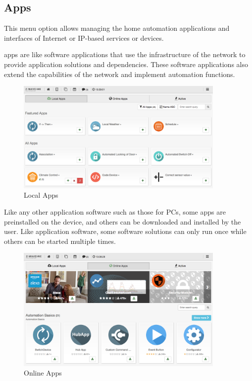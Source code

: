 \subsection{Apps}
\label{appssetup}

This menu option allows managing the home automation applications and interfaces of 
Internet or IP-based services or devices.

\zway apps are like software applications that use the infrastructure of the \zwave 
network to provide application solutions and dependencies. These software applications also 
extend the capabilities of the network and implement automation functions.

\begin{figure}
\begin{center}
\includegraphics[width=0.9\textwidth]{pngs/cap4/app2.png}
\caption{Local Apps}
\label{app2}
\end{center}
\end{figure}

Like any other application software such as those for PCs, some \zway apps are preinstalled 
on the device, and others can be downloaded and installed by the user. Like application 
software, some software solutions can only run once while others can be started multiple times.


\begin{figure}
\begin{center}
\includegraphics[width=0.9\textwidth]{pngs/cap4/app1.png}
\caption{Online Apps}
\label{app1}
\end{center}
\end{figure}

